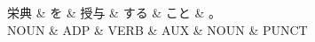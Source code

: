 \documentclass[tikz,border=5pt]{standalone}
\begin{document}
\normalsize
\begin{dependency}[edge unit distance=12.0pt]
    \begin{deptext}[column sep=1em]
        栄典 \& を \& 授与 \& する \& こと \& 。\\
        NOUN \& ADP \& VERB \& AUX \& NOUN \& PUNCT\\
    \end{deptext}
\end{dependency}
\end{document}
